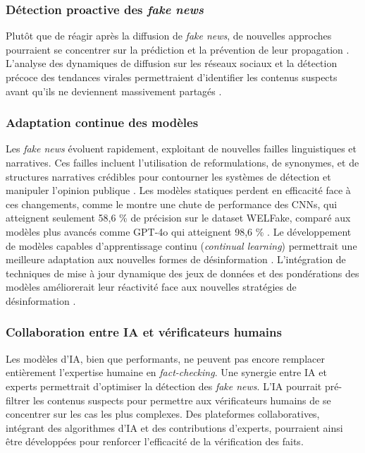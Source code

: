 \documentclass[a4paper,12pt, twocolumn]{article}
\begin{document}
\begin{twocolumn}
\subsubsection{Détection proactive des \textit{fake news}}
Plutôt que de réagir après la diffusion de \textit{fake news}, de nouvelles approches pourraient se concentrer sur la prédiction et la prévention de leur propagation \cite{hu_bad_2024}. L’analyse des dynamiques de diffusion sur les réseaux sociaux et la détection précoce des tendances virales permettraient d’identifier les contenus suspects avant qu’ils ne deviennent massivement partagés \cite{alghamdi_towards_2023}.

\subsubsection{Adaptation continue des modèles}
Les \textit{fake news} évoluent rapidement, exploitant de nouvelles failles linguistiques et narratives. Ces failles incluent l'utilisation de reformulations, de synonymes, et de structures narratives crédibles pour contourner les systèmes de détection et manipuler l'opinion publique \cite{hu_bad_2024}. Les modèles statiques perdent en efficacité face à ces changements, comme le montre une chute de performance des CNNs, qui atteignent seulement 58,6 \% de précision sur le dataset WELFake, comparé aux modèles plus avancés comme GPT-4o qui atteignent 98,6 \% \cite{roumeliotis_fake_2025}. Le développement de modèles capables d’apprentissage continu (\textit{continual learning}) permettrait une meilleure adaptation aux nouvelles formes de désinformation \cite{alghamdi_towards_2023}. L'intégration de techniques de mise à jour dynamique des jeux de données et des pondérations des modèles améliorerait leur réactivité face aux nouvelles stratégies de désinformation \cite{rai_fake_2022}.

\subsubsection{Collaboration entre IA et vérificateurs humains}
Les modèles d'IA, bien que performants, ne peuvent pas encore remplacer entièrement l’expertise humaine en \textit{fact-checking}. Une synergie entre IA et experts permettrait d’optimiser la détection des \textit{fake news}. L’IA pourrait pré-filtrer les contenus suspects pour permettre aux vérificateurs humains de se concentrer sur les cas les plus complexes. Des plateformes collaboratives, intégrant des algorithmes d’IA et des contributions d’experts, pourraient ainsi être développées pour renforcer l’efficacité de la vérification des faits.


\end{twocolumn}
\end{document}
